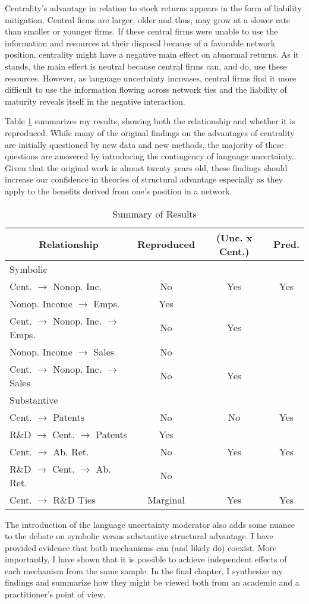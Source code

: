 Centrality's advantage in relation to stock returns appears in the form of liability mitigation. Central firms are larger, older and thus, may grow at a slower rate than smaller or younger firms. If these central firms were unable to use the information and resources at their disposal because of a favorable network position, centrality might have a negative main effect on abnormal returns. As it stands, the main effect is neutral because central firms can, and do, use these resources. However, as language uncertainty increases, central firms find it more difficult to use the information flowing across network ties and the liability of maturity reveals itself in the negative interaction.

Table \ref{summary} summarizes my results, showing both the relationship and whether it is reproduced. While many of the original findings on the advantages of centrality are initially questioned by new data and new methods, the majority of these questions are answered by introducing the contingency of language uncertainty. Given that the original work is almost twenty years old, these findings should increase our confidence in theories of structural advantage especially as they apply to the benefits derived from one's position in a network.

\begin{table}[htbp]\centering \caption{Summary of Results\label{summary}}
\begin{tabular}{l  c  c  c  }\hline\hline
\multicolumn{1}{c}{Relationship} & Reproduced & (Unc. x Cent.) & Pred. \\ \hline
Symbolic \\ \hline
Cent. $\rightarrow$ Nonop. Inc. & No & Yes & Yes\\
Nonop. Income $\rightarrow$ Emps. & Yes\\
Cent. $\rightarrow$ Nonop. Inc. $\rightarrow$ Emps. & No & Yes\\
Nonop. Income $\rightarrow$ Sales & No\\
Cent. $\rightarrow$ Nonop. Inc. $\rightarrow$ Sales & No & Yes\\
\hline
Substantive \\ \hline
Cent. $\rightarrow$ Patents & No & No & Yes\\
R\&D $\rightarrow$ Cent. $\rightarrow$ Patents & Yes\\
Cent. $\rightarrow$ Ab. Ret. & No & Yes & Yes\\
R\&D $\rightarrow$ Cent. $\rightarrow$ Ab. Ret. & No\\
Cent. $\rightarrow$ R\&D Ties & Marginal & Yes & Yes\\
\hline \hline 
 \end{tabular}
\end{table}

The introduction of the language uncertainty moderator also adds some nuance to the debate on symbolic versus substantive structural advantage. I have provided evidence that both mechanisms can (and likely do) coexist. More importantly, I have shown that it is possible to achieve independent effects of each mechanism from the same sample. In the final chapter, I synthesize my findings and summarize how they might be viewed both from an academic and a practitioner's point of view.


